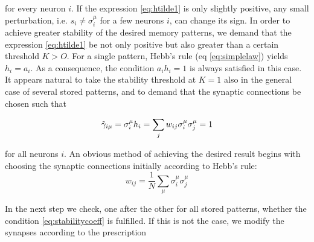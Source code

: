 for every neuron $i$. If the expression \ref{eq:htilde1} is only slightly positive, any small perturbation, i.e. $s_{i}\neq \sigma_{i}^{\mu}$ for a few neurons $i$, can change its sign. In order to achieve greater stability of the desired memory patterns, we demand that the expression \ref{eq:htilde1} be not only positive but also greater than a certain threshold $K>O$. For a single pattern, Hebb's rule (eq \ref{eq:simplelaw}) yields $h_i = a_i$. As a consequence, the condition $a_{i}h_{i} = 1$ is always satisfied in this case. It appears natural to take the stability threshold at $K = 1$ also in the general case of several stored patterns, and to demand that the synaptic connections be chosen such that

\begin{equation}
       \Tilde{\gamma}_{i \mu}= \sigma_{i}^{\mu}h_{i}=\sum_{j}w_{ij}\sigma_{i}^{\mu}\sigma_{j}^{\mu}=1
       \label{eq:stabilitycoeff}
\end{equation}

for all neurons $i$.
An obvious method of achieving the desired result begins with choosing the synaptic connections initially according to Hebb's rule:
\begin{equation}
w_{ij}=\frac{1}{N}\sum_{\mu}\sigma^{\mu}_{i}\sigma^{\mu}_{j}    
\end{equation}

In the next step we check, one after the other for all stored patterns, whether
the condition \ref{eq:stabilitycoeff} is fulfilled. If this is not the case, we modify the synapses
according to the prescription

